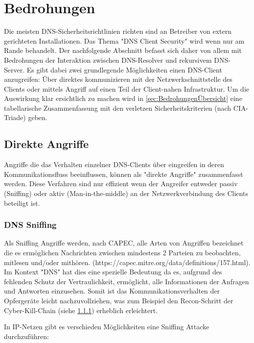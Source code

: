 \chapter{Bedrohungen}

Die meisten DNS-Sicherheitsrichtlinien richten sind an Betreiber von extern gerichteten Installationen. Das Thema "DNS Client Security" wird wenn nur am Rande behandelt. Der nachfolgende Abschnitt befasst sich daher von allem mit Bedrohungen der Interaktion zwischen DNS-Resolver und rekursivem DNS-Server. 
Es gibt dabei zwei grundlegende Möglichkeiten einen DNS-Client anzugreifen: Über direktes kommunizieren mit der Netzwerkschnittstelle des Clients oder mittels Angriff auf einen Teil der Client-nahen Infrastruktur. Um die Auswirkung klar ersichtlich zu machen wird in \ref{sec:BedrohungenÜbersicht} eine tabellarische Zusammenfassung mit den verletzen Sicherheitskriterien (nach CIA-Triade) geben. 

\section{Direkte Angriffe}

Angriffe die das Verhalten einzelner DNS-Clients über eingreifen in deren Kommunikationsfluss beeinflussen, können als "direkte Angriffe" zusammenfasst werden. Diese Verfahren sind nur effizient wenn der Angreifer entweder passiv (Sniffing) oder aktiv (Man-in-the-middle) an der Netzwerkverbindung des Clients beteiligt ist. 

\subsection{DNS Sniffing}

Als Sniffing Angriffe werden, nach CAPEC, alle Arten von Angriffen bezeichnet die es ermöglichen Nachrichten zwischen mindestens 2 Parteien zu beobachten, mitlesen und/oder mithören. (https://capec.mitre.org/data/definitions/157.html). Im Kontext "DNS" hat dies eine spezielle Bedeutung da es, aufgrund des fehlenden Schutz der Vertraulichkeit, ermöglicht, alle Informationen der Anfragen und Antworten einzusehen. Somit ist das Kommunikationsverhalten der Opfergeräte leicht nachzuvollziehen, was zum Beispiel den Recon-Schritt der Cyber-Kill-Chain (siehe \ref{}) erheblich erleichtert. 

In IP-Netzen gibt es verschieden Möglichkeiten eine Sniffing Attacke durchzuführen: 

